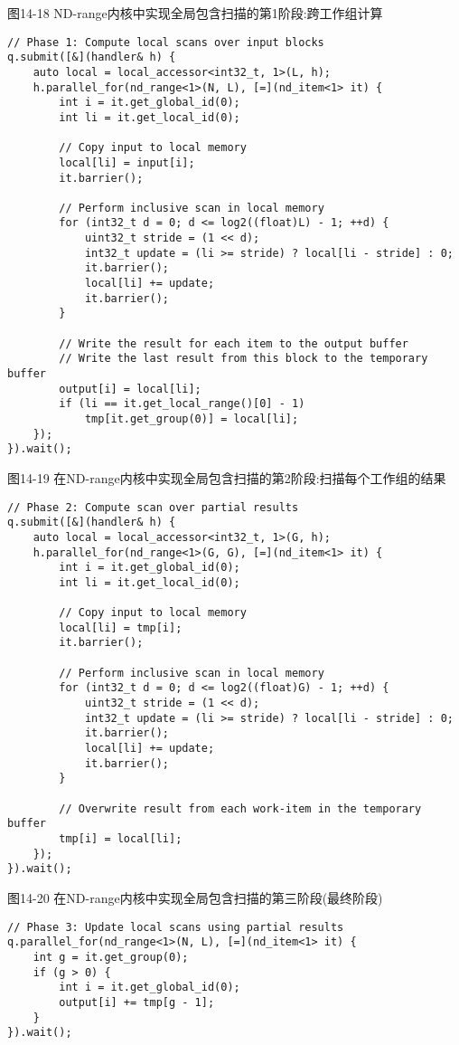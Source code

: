 \hspace*{\fill} \par %
图14-18 ND-range内核中实现全局包含扫描的第1阶段:跨工作组计算
\begin{lstlisting}[caption={}]
// Phase 1: Compute local scans over input blocks
q.submit([&](handler& h) {
	auto local = local_accessor<int32_t, 1>(L, h);
	h.parallel_for(nd_range<1>(N, L), [=](nd_item<1> it) {
		int i = it.get_global_id(0);
		int li = it.get_local_id(0);
		
		// Copy input to local memory
		local[li] = input[i];
		it.barrier();
		
		// Perform inclusive scan in local memory
		for (int32_t d = 0; d <= log2((float)L) - 1; ++d) {
			uint32_t stride = (1 << d);
			int32_t update = (li >= stride) ? local[li - stride] : 0;
			it.barrier();
			local[li] += update;
			it.barrier();
		}
	
		// Write the result for each item to the output buffer
		// Write the last result from this block to the temporary buffer
		output[i] = local[li];
		if (li == it.get_local_range()[0] - 1)
			tmp[it.get_group(0)] = local[li];
	});
}).wait();
\end{lstlisting}

\hspace*{\fill} \par %
图14-19 在ND-range内核中实现全局包含扫描的第2阶段:扫描每个工作组的结果
\begin{lstlisting}[caption={}]
// Phase 2: Compute scan over partial results
q.submit([&](handler& h) {
	auto local = local_accessor<int32_t, 1>(G, h);
	h.parallel_for(nd_range<1>(G, G), [=](nd_item<1> it) {
		int i = it.get_global_id(0);
		int li = it.get_local_id(0);
		
		// Copy input to local memory
		local[li] = tmp[i];
		it.barrier();
		
		// Perform inclusive scan in local memory
		for (int32_t d = 0; d <= log2((float)G) - 1; ++d) {
			uint32_t stride = (1 << d);
			int32_t update = (li >= stride) ? local[li - stride] : 0;
			it.barrier();
			local[li] += update;
			it.barrier();
		}
	
		// Overwrite result from each work-item in the temporary buffer
		tmp[i] = local[li];
	});
}).wait();
\end{lstlisting}

\hspace*{\fill} \par %
图14-20 在ND-range内核中实现全局包含扫描的第三阶段(最终阶段)
\begin{lstlisting}[caption={}]
// Phase 3: Update local scans using partial results
q.parallel_for(nd_range<1>(N, L), [=](nd_item<1> it) {
	int g = it.get_group(0);
	if (g > 0) {
		int i = it.get_global_id(0);
		output[i] += tmp[g - 1];
	}
}).wait();
\end{lstlisting}

